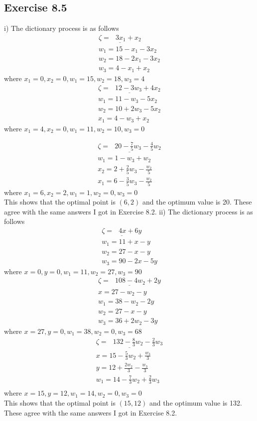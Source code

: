 \documentclass[11.5pt, letterpaper, bibtotoc,
    tablecaptionabove, figurecaptionabove]{article}
\begin{document}
\subsection*{Exercise 8.5}
i)
The dictionary process is as follows
\begin{align*}
	\underline{\zeta = \:\:\: 3x_1 + x_2}\\
	w_1 = 15 - x_1 - 3x_2 \\
	w_2 = 18 - 2x_1 - 3x_2 \\
	w_3 = 4 - x_1 + x_2
\end{align*}
where $x_1 = 0, x_2 = 0, w_1 = 15, w_2 = 18, w_3 = 4$
\begin{align*}
	\underline{\zeta = \:\:\: 12 - 3w_3 + 4x_2}\\
	w_1 = 11 - w_3 - 5x_2 \\
	w_2 = 10 + 2w_3 - 5x_2 \\
	x_1 = 4 - w_3 + x_2
\end{align*}
where $x_1 = 4, x_2 = 0, w_1 = 11, w_2 = 10, w_3 = 0$

\begin{align*}
	\underline{\zeta = \:\:\: 20 - \frac{7}{5}w_3 - \frac{4}{5}w_2}\\
	w_1 = 1 - w_3 + w_2 \\
	x_2 = 2 + \frac{2}{5}w_3 - \frac{w_2}{5} \\
	x_1 = 6 - \frac{3}{5}w_3 - \frac{w_2}{5}
\end{align*}
where $x_1 = 6, x_2 = 2, w_1 = 1, w_2 = 0, w_3 = 0$\\
This shows that the optimal point is $(6, 2)$ and the optimum value is 20.  These agree with the same answers I got in Exercise 8.2.
ii)
The dictionary process is as follows
\begin{align*}
	\underline{\zeta = \:\:\: 4x + 6y}\\
	w_1 = 11 + x - y \\
	w_2 = 27 - x - y \\
	w_3 = 90 - 2x - 5y
\end{align*}
where $x = 0, y = 0, w_1 = 11, w_2 = 27, w_3 = 90$
\begin{align*}
	\underline{\zeta = \:\:\: 108 - 4w_2 +2y}\\
	x = 27 - w_2 - y\\
	w_1 = 38 - w_2 - 2y \\
	w_2 = 27 - x - y \\
	w_3 = 36 + 2w_2 - 3y
\end{align*}
where $x = 27, y = 0, w_1 = 38, w_2 = 0, w_3 = 68$
\begin{align*}
	\underline{\zeta = \:\:\: 132 - \frac{8}{3}w_2 - \frac{2}{3}w_3}\\
	x = 15 - \frac{5}{3}w_2 + \frac{w_3}{3}\\
	y = 12 + \frac{2w_2}{3} - \frac{w_3}{3} \\
	w_1 = 14 - \frac{7}{3}w_2 + \frac{2}{3}w_3 \\
\end{align*}
where $x = 15, y = 12, w_1 = 14, w_2 = 0, w_3 = 0$\\
This shows that the optimal point is $(15, 12)$ and the optimum value is 132.  These agree with the same answers I got in Exercise 8.2.
\end{document}
